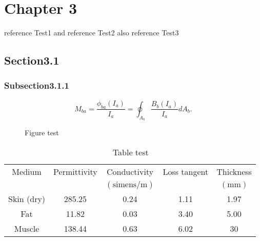 
\chapter{ Chapter 3}
\label{chap:chapter3}
\vspace*{-0.3cm}
reference Test1\cite{Katabi2015}
and reference Test2\cite{Kisseleff_beam}
also reference Test3\cite{MZhou}

\section{ Section3.1}
\label{sec:section3.1}

\subsection{ Subsection3.1.1}
\label{subsec:subsection3.1.1}

\begin{equation}  \label{eq:3.1}
M_{ba}=\frac{\phi_{ba}(I_a)}{I_a}=\oint_{A_b}{\frac{B_{b}(I_a)}{I_a}}dA_b.
\end{equation}
%
\begin{figure*}[tbp]
\begin{center}
  \vspace*{-0.3cm}
  \caption{Figure test}%
  \label{fig3.1}
\end{center}
\vspace*{-0.6cm}
\end{figure*}
%
\begin{table}[tbp]
   \centering
   \caption{$\,$Table test} %
   \begin{tabular}{@{} ccccc @{}} %
      \hline
      Medium    & Permittivity & Conductivity & Loss tangent & Thickness \\
          &   & $(\textrm{simens/m})$ &  &  $(\textrm{mm})$\\
      \hline
      Skin (dry)  & 285.25 & 0.24 & 1.11 & 1.97 \\
      Fat & 11.82 & 0.03 & 3.40 & 5.00 \\
      Muscle & 138.44 & 0.63  & 6.02 & 30 \\
      \hline
 \end{tabular}
   \label{table3.1}
\end{table}
